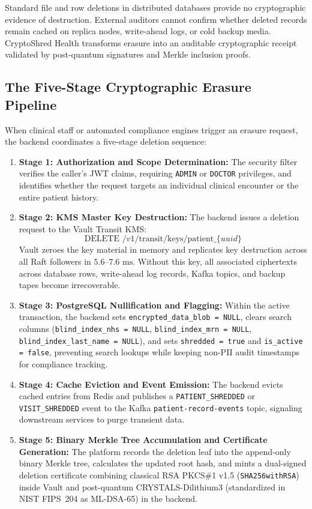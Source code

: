 Standard file and row deletions in distributed databases provide no cryptographic evidence of destruction. External auditors cannot confirm whether deleted records remain cached on replica nodes, write-ahead logs, or cold backup media. CryptoShred Health transforms erasure into an auditable cryptographic receipt validated by post-quantum signatures and Merkle inclusion proofs.

\subsection{The Five-Stage Cryptographic Erasure Pipeline}

When clinical staff or automated compliance engines trigger an erasure request, the backend coordinates a five-stage deletion sequence:
\begin{enumerate}
    \item \textbf{Stage 1: Authorization and Scope Determination:} The security filter verifies the caller's JWT claims, requiring \texttt{ADMIN} or \texttt{DOCTOR} privileges, and identifies whether the request targets an individual clinical encounter or the entire patient history.

    \item \textbf{Stage 2: KMS Master Key Destruction:} The backend issues a deletion request to the Vault Transit KMS:
    \begin{equation}
        \text{DELETE } /v1/\text{transit/keys/patient\_}\{uuid\}
        \label{eq:vault-delete}
    \end{equation}
    Vault zeroes the key material in memory and replicates key destruction across all Raft followers in $5.6\text{--}7.6\text{~ms}$. Without this key, all associated ciphertexts across database rows, write-ahead log records, Kafka topics, and backup tapes become irrecoverable.

    \item \textbf{Stage 3: PostgreSQL Nullification and Flagging:} Within the active transaction, the backend sets \texttt{encrypted\_data\_blob = NULL}, clears search columns (\texttt{blind\_index\_nhs = NULL}, \texttt{blind\_index\_mrn = NULL}, \texttt{blind\_index\_last\_name = NULL}), and sets \texttt{shredded = true} and \texttt{is\_active = false}, preventing search lookups while keeping non-PII audit timestamps for compliance tracking.

    \item \textbf{Stage 4: Cache Eviction and Event Emission:} The backend evicts cached entries from Redis and publishes a \texttt{PATIENT\_SHREDDED} or \texttt{VISIT\_SHREDDED} event to the Kafka \texttt{patient-record-events} topic, signaling downstream services to purge transient data.

    \item \textbf{Stage 5: Binary Merkle Tree Accumulation and Certificate Generation:} The platform records the deletion leaf into the append-only binary Merkle tree, calculates the updated root hash, and mints a dual-signed deletion certificate combining classical RSA PKCS\#1 v1.5 (\texttt{SHA256withRSA}) inside Vault and post-quantum CRYSTALS-Dilithium3 (standardized in NIST FIPS~204 as ML-DSA-65) in the backend.
\end{enumerate}

